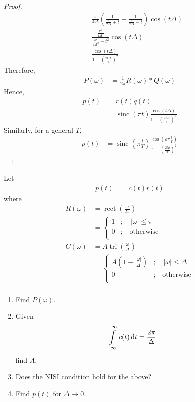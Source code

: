 \documentclass[titlepage, fleqn, a4paper, 12pt, twoside]{article}
\theoremstyle{definition}
\theoremstyle{theorem}
\DeclareMathOperator{\sinc}{\mathrm{sinc}}
\DeclareMathOperator{\rect}{\mathrm{rect}}
\DeclareMathOperator{\tri}{\mathrm{tri}}
\begin{document}
\begin{proof}
\begin{align*}
		&= \frac{\pi}{4 \Delta} \left( \frac{1}{\frac{\pi}{2 \Delta} + t} + \frac{1}{\frac{\pi}{2 \Delta} - t} \right) \cos(t \Delta)\\
		&= \frac{\frac{\pi^2}{4 \Delta^2}}{\frac{\pi^2}{4 \Delta^2} - t^2} \cos(t \Delta)\\
		&= \frac{\cos(t \Delta)}{1 - \left( \frac{2 t \Delta}{\pi} \right)^2}
	\end{align*}
	Therefore,
	\begin{align*}
		P(\omega) &= \frac{1}{2 \pi} R(\omega) \ast Q(\omega)
	\end{align*}
	Hence,
	\begin{align*}
		p(t) &= r(t) q(t)\\
		&= \sinc(\pi t) \frac{\cos(t \Delta)}{1 - \left( \frac{2 t \Delta}{\pi} \right)^2}
	\end{align*}
	Similarly, for a general $T$,
	\begin{align*}
		p(t) &= \sinc\left( \pi \frac{t}{T} \right) \frac{\cos\left( \rho \pi \frac{t}{T} \right)}{1 - \left( \frac{2 t \rho}{T} \right)^2}
	\end{align*}
\end{proof}

\begin{question}
	Let
	\begin{align*}
		p(t) &= c(t) r(t)
	\end{align*}
	where
	\begin{align*}
		R(\omega) &= \rect\left( \frac{\omega}{2 \pi} \right)\\
		&=
			\begin{cases}
				1 &;\quad |\omega| \le \pi\\
				0 &;\quad \text{otherwise}\\
			\end{cases}\\
		C(\omega) &= A \tri\left( \frac{\omega}{\Delta} \right)\\
		&=
			\begin{cases}
				A \left( 1 - \frac{|\omega|}{\Delta} \right) &;\quad |\omega| \le \Delta\\
				0 &;\quad \text{otherwise}\\
			\end{cases}\\
	\end{align*}
	\begin{enumerate}
		\item
			Find $P(\omega)$.
		\item
			Given
			\begin{align*}
				\int\limits_{-\infty}^{\infty} c(t) \dif t &= \frac{2 \pi}{\Delta}
			\end{align*}
			find $A$.
		\item
			Does the NISI condition hold for the above?
		\item
			Find $p(t)$ for $\Delta \to 0$.
	\end{enumerate}
\end{question}
\end{document}
